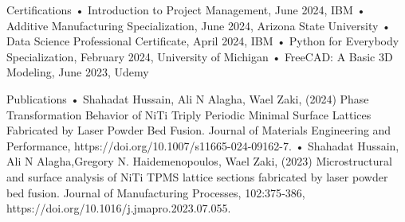 Certifications
• Introduction to Project Management, June 2024, IBM
• Additive Manufacturing Specialization, June 2024, Arizona State University
• Data Science Professional Certificate, April 2024, IBM
• Python for Everybody Specialization, February 2024, University of Michigan
• FreeCAD: A Basic 3D Modeling, June 2023, Udemy

Publications
• Shahadat Hussain, Ali N Alagha, Wael Zaki, (2024) Phase Transformation Behavior of NiTi Triply Periodic Minimal
Surface Lattices Fabricated by Laser Powder Bed Fusion. Journal of Materials Engineering and Performance,
https://doi.org/10.1007/s11665-024-09162-7.
• Shahadat Hussain, Ali N Alagha,Gregory N. Haidemenopoulos, Wael Zaki, (2023) Microstructural and surface
analysis of NiTi TPMS lattice sections fabricated by laser powder bed fusion. Journal of Manufacturing Processes,
102:375‑386, https://doi.org/10.1016/j.jmapro.2023.07.055.
